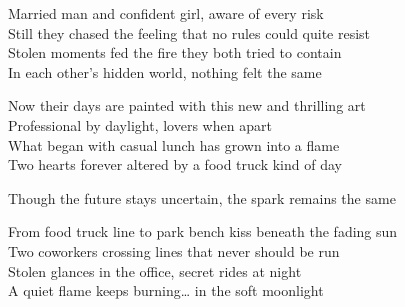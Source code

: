 \begin{lyrics}
Married man and confident girl, aware of every risk\\
Still they chased the feeling that no rules could quite resist\\
Stolen moments fed the fire they both tried to contain\\
In each other’s hidden world, nothing felt the same

Now their days are painted with this new and thrilling art\\
Professional by daylight, lovers when apart\\
What began with casual lunch has grown into a flame\\
Two hearts forever altered by a food truck kind of day

Though the future stays uncertain, the spark remains the same

From food truck line to park bench kiss beneath the fading sun\\
Two coworkers crossing lines that never should be run\\
Stolen glances in the office, secret rides at night\\
A quiet flame keeps burning… in the soft moonlight

\end{lyrics}

